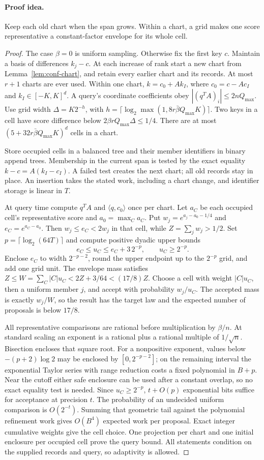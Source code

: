 \documentclass[11pt]{article}
\theoremstyle{definition}\newtheorem{definition}[theorem]{Definition}
\theoremstyle{remark}\newtheorem{remark}[theorem]{Remark}
\numberwithin{equation}{section}
\begin{document}
\paragraph{Proof idea.}
Keep each old chart when the span grows. Within a chart, a grid makes
one score representative a constant-factor envelope for its whole cell.
\begin{proof}
The case $\beta=0$ is uniform sampling. Otherwise fix the first key $c$.
Maintain a basis of differences $k_j-c$. At each increase of rank start
a new chart from Lemma~\ref{lem:conf-chart}, and retain every earlier
chart and its records. At most $r+1$ charts are ever used. Within one
chart, $k=c_0+Ak_I$, where $c_0=c-Ac_I$ and $k_I\in[-K,K]^d$.
A query's coordinate coefficients obey $|(q^TA)_i|\le2nQ_{\max}$.
Use grid width $\Delta=K2^{-h}$, with
$h=\lceil\log_2\max(1,8r\bar\beta Q_{\max}K)\rceil$.
Two keys in a cell have score difference below
$2\beta rQ_{\max}\Delta\le1/4$. There are at most
$(5+32r\bar\beta Q_{\max}K)^d$ cells in a chart.

Store occupied cells in a balanced tree and their member identifiers in
binary append trees. Membership in the current span is tested by the
exact equality $k-c=A(k_I-c_I)$. A failed test creates the next chart;
all old records stay in place. An insertion takes the stated work,
including a chart change, and identifier storage is linear in $T$.

At query time compute $q^TA$ and $\langle q,c_0\rangle$ once per
chart. Let $a_C$ be each occupied cell's representative score and
$a_0=\max_Ca_C$. Put $w_j=e^{a_j-a_0-1/4}$ and
$e_C=e^{a_C-a_0}$. Then $w_j\le e_C<2w_j$ in that cell, while
$Z=\sum_jw_j>1/2$. Set $p=\lceil\log_2(64T)\rceil$ and compute
positive dyadic upper bounds
\[
 e_C\le u_C\le e_C+3\,2^{-p},\qquad u_C\ge2^{-p}.
\]
Enclose $e_C$ to width $2^{-p-2}$, round the upper endpoint up to the
$2^{-p}$ grid, and add one grid unit. The envelope mass satisfies
$Z\le W=\sum_C|C|u_C<2Z+3/64<(17/8)Z$.
Choose a cell with weight $|C|u_C$, then a uniform member $j$, and
accept with probability $w_j/u_C$. The accepted mass is exactly
$w_j/W$, so the result has the target law and the expected number of
proposals is below $17/8$.

All representative comparisons are rational before multiplication by
$\beta/n$. At standard scaling an exponent is a rational plus a
rational multiple of $1/\sqrt n$. Bisection encloses that square root.
For a nonpositive exponent, values below $-(p+2)\log2$ may be enclosed
by $[0,2^{-p-2}]$; on the remaining interval the exponential Taylor
series with range reduction costs a fixed polynomial in $B+p$.
Near the cutoff either safe enclosure can be used after a constant
overlap, so no exact equality test is needed. Since $u_C\ge2^{-p}$,
$t+O(p)$ exponential bits suffice for acceptance at precision $t$.
The probability of an undecided uniform comparison is $O(2^{-t})$.
Summing that geometric tail against the polynomial refinement work
gives $O(B^4)$ expected work per proposal. Exact integer cumulative
weights give the cell choice. One projection per chart and one initial
enclosure per occupied cell prove the query bound. All statements
condition on the supplied records and query, so adaptivity is allowed.
\end{proof}
\end{document}
